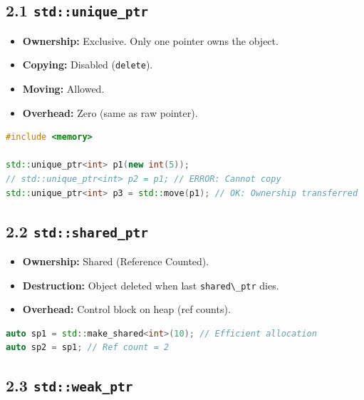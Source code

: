 \hypertarget{stdunique_ptr}{%
\subsection{\texorpdfstring{2.1
\texttt{std::unique\_ptr}}{2.1 std::unique\_ptr}}\label{stdunique_ptr}}

\begin{itemize}
\tightlist
\item
  \textbf{Ownership:} Exclusive. Only one pointer owns the object.
\item
  \textbf{Copying:} Disabled (\passthrough{\lstinline!delete!}).
\item
  \textbf{Moving:} Allowed.
\item
  \textbf{Overhead:} Zero (same as raw pointer).
\end{itemize}

\begin{lstlisting}[language={C++}]
#include <memory>

std::unique_ptr<int> p1(new int(5));
// std::unique_ptr<int> p2 = p1; // ERROR: Cannot copy
std::unique_ptr<int> p3 = std::move(p1); // OK: Ownership transferred
\end{lstlisting}

\hypertarget{stdshared_ptr}{%
\subsection{\texorpdfstring{2.2
\texttt{std::shared\_ptr}}{2.2 std::shared\_ptr}}\label{stdshared_ptr}}

\begin{itemize}
\tightlist
\item
  \textbf{Ownership:} Shared (Reference Counted).
\item
  \textbf{Destruction:} Object deleted when last
  \passthrough{\lstinline!shared\_ptr!} dies.
\item
  \textbf{Overhead:} Control block on heap (ref counts).
\end{itemize}

\begin{lstlisting}[language={C++}]
auto sp1 = std::make_shared<int>(10); // Efficient allocation
auto sp2 = sp1; // Ref count = 2
\end{lstlisting}

\hypertarget{stdweak_ptr}{%
\subsection{\texorpdfstring{2.3
\texttt{std::weak\_ptr}}{2.3 std::weak\_ptr}}\label{stdweak_ptr}}

